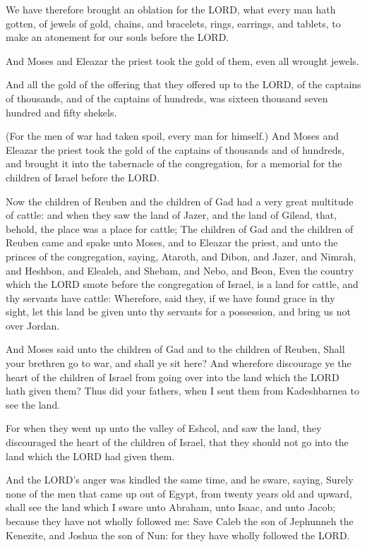 \Verse We have therefore brought an oblation for the LORD, what every
man hath gotten, of jewels of gold, chains, and bracelets, rings,
earrings, and tablets, to make an atonement for our souls before the
LORD.

\Verse And Moses and Eleazar the priest took the gold of them, even all
wrought jewels.

\Verse And all the gold of the offering that they offered up to the
LORD, of the captains of thousands, and of the captains of hundreds,
was sixteen thousand seven hundred and fifty shekels.

\Verse (For the men of war had taken spoil, every man for himself.)
\Verse And Moses and Eleazar the priest took the gold of the captains
of thousands and of hundreds, and brought it into the tabernacle of
the congregation, for a memorial for the children of Israel before the
LORD.


\Chapter
\Verse Now the children of Reuben and the children of Gad had a very
great multitude of cattle: and when they saw the land of Jazer, and
the land of Gilead, that, behold, the place was a place for cattle;
\Verse The children of Gad and the children of Reuben came and spake
unto Moses, and to Eleazar the priest, and unto the princes of the
congregation, saying, \Verse Ataroth, and Dibon, and Jazer, and Nimrah,
and Heshbon, and Elealeh, and Shebam, and Nebo, and Beon, \Verse Even
the country which the LORD smote before the congregation of Israel, is
a land for cattle, and thy servants have cattle: \Verse Wherefore, said
they, if we have found grace in thy sight, let this land be given unto
thy servants for a possession, and bring us not over Jordan.

\Verse And Moses said unto the children of Gad and to the children of
Reuben, Shall your brethren go to war, and shall ye sit here?  \Verse
And wherefore discourage ye the heart of the children of Israel from
going over into the land which the LORD hath given them?  \Verse Thus
did your fathers, when I sent them from Kadeshbarnea to see the land.

\Verse For when they went up unto the valley of Eshcol, and saw the
land, they discouraged the heart of the children of Israel, that they
should not go into the land which the LORD had given them.

\Verse And the LORD's anger was kindled the same time, and he sware,
saying, \Verse Surely none of the men that came up out of Egypt, from
twenty years old and upward, shall see the land which I sware unto
Abraham, unto Isaac, and unto Jacob; because they have not wholly
followed me: \Verse Save Caleb the son of Jephunneh the Kenezite, and
Joshua the son of Nun: for they have wholly followed the LORD.

